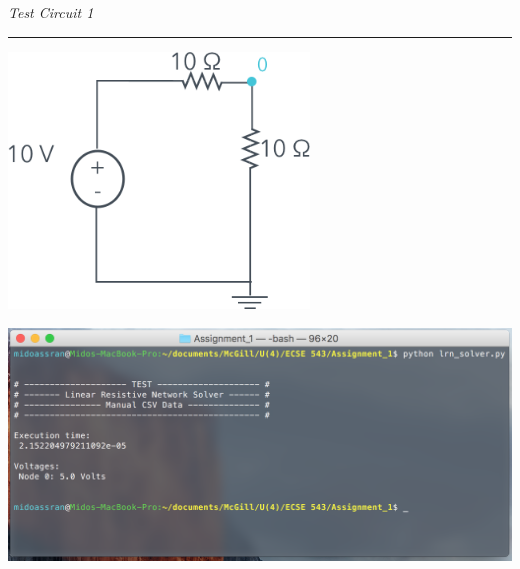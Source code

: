 \documentclass[11pt]{amsart}
\begin{document}
\begin{minipage}{\textwidth}
    \textit{Test Circuit 1}\\
    \noindent\rule[0.5ex]{\linewidth}{0.5pt}
\end{minipage}
\begin{minipage}{0.3\textwidth}
\end{minipage}
\begin{minipage}{0.7\textwidth}
	\begin{center}
		\vspace{1em}
        		\includegraphics[width=0.6\textwidth]{assets/sk_test_c1.png}
	\end{center}
\end{minipage}
\begin{minipage}{\textwidth}
	\vspace{2em}
	\centering
	\includegraphics[width=\textwidth]{assets/test_c1.png}
\end{minipage}
\pagebreak
\end{document}
